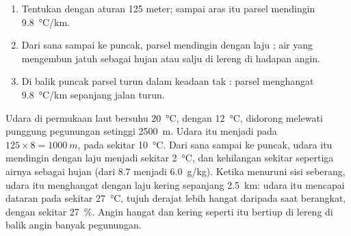 \begin{method}\label{met:g10:why-clouds-form:mountain}
\begin{enumerate}
  \item Tentukan  dengan aturan 125 meter; sampai aras itu
        parsel mendingin \qty{9.8}{\degreeCelsius/km}.
  \item Dari sana sampai ke puncak, parsel mendingin dengan laju ; air
        yang mengembun jatuh sebagai hujan atau salju di lereng di hadapan
        angin.
  \item Di balik puncak parsel turun dalam keadaan tak : parsel
        menghangat \qty{9.8}{\degreeCelsius/km} sepanjang jalan turun.
\end{enumerate}
\end{method}

\begin{example}\label{ex:g10:why-clouds-form:lee}
Udara di permukaan laut bersuhu \qty{20}{\degreeCelsius}, dengan 
\qty{12}{\degreeCelsius}, didorong melewati punggung pegunungan setinggi
\qty{2500}{m}. Udara itu menjadi  pada $125 \times 8 = \qty{1000}{m}$,
pada sekitar \qty{10}{\degreeCelsius}. Dari sana sampai ke puncak, udara itu
mendingin dengan laju  menjadi sekitar \qty{2}{\degreeCelsius}, dan
kehilangan sekitar sepertiga airnya sebagai hujan (dari \num{8.7} menjadi
\qty{6.0}{g/kg}). Ketika menuruni sisi seberang, udara itu menghangat dengan
laju kering sepanjang \qty{2.5}{km}: udara itu mencapai dataran pada sekitar
\qty{27}{\degreeCelsius}, tujuh derajat lebih hangat daripada saat berangkat,
dengan  sekitar \qty{27}{\percent}. Angin hangat dan kering
seperti itu bertiup di lereng di balik angin banyak pegunungan.
\end{example}

